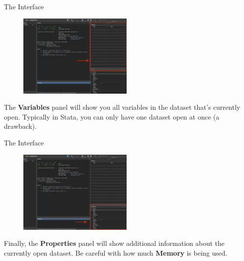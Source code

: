 \documentclass[11pt,notes=hide,aspectratio=169,mathserif]{beamer}
\begin{document}
\begin{frame}{The Interface}
    \begin{figure}
        \centering
        \includegraphics[width=0.5\textwidth]{inputs/ta1_result_window5.png}
    \end{figure}
    The \textbf{Variables} panel will show you all variables in the dataset that's currently open. 
    Typically in Stata, you can only have one dataset open at once (a drawback). 
\end{frame}

\begin{frame}{The Interface}
    \begin{figure}
        \centering
        \includegraphics[width=0.5\textwidth]{inputs/ta1_result_window6.png}
    \end{figure}
   Finally, the \textbf{Properties} panel will show additional information about the currently open dataset. 
   Be careful with how much \textbf{Memory} is being used.
\end{frame}
\end{document}

